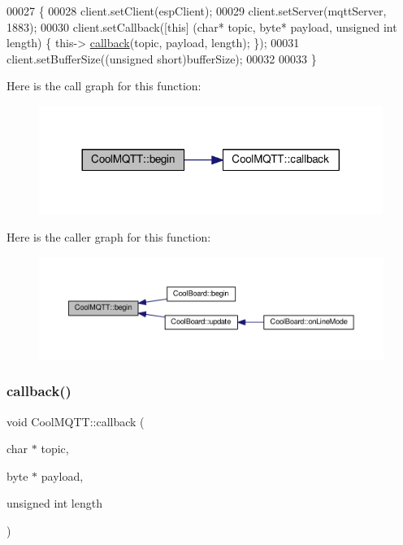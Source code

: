 \begin{DoxyCode}
00027 \{ 
00028     client.setClient(espClient);
00029     client.setServer(mqttServer, 1883); 
00030     client.setCallback([\textcolor{keyword}{this}] (\textcolor{keywordtype}{char}* topic, byte* payload, \textcolor{keywordtype}{unsigned} \textcolor{keywordtype}{int} length) \{ this->
      \hyperlink{class_cool_m_q_t_t_a30d82ad665bfb603f46ecdbc290775df}{callback}(topic, payload, length); \});
00031     client.setBufferSize((\textcolor{keywordtype}{unsigned} \textcolor{keywordtype}{short})bufferSize);
00032 
00033 \}
\end{DoxyCode}
Here is the call graph for this function\+:\nopagebreak
\begin{figure}[H]
\begin{center}
\leavevmode
\includegraphics[width=317pt]{class_cool_m_q_t_t_ac9248808641ebf3054ed0620ea9d0100_cgraph}
\end{center}
\end{figure}
Here is the caller graph for this function\+:
\nopagebreak
\begin{figure}[H]
\begin{center}
\leavevmode
\includegraphics[width=350pt]{class_cool_m_q_t_t_ac9248808641ebf3054ed0620ea9d0100_icgraph}
\end{center}
\end{figure}
\mbox{\label{class_cool_m_q_t_t_a30d82ad665bfb603f46ecdbc290775df}} 
\subsubsection{\texorpdfstring{callback()}{callback()}}
{\footnotesize\ttfamily void Cool\+M\+Q\+T\+T\+::callback (\begin{DoxyParamCaption}\item[{char $\ast$}]{topic,  }\item[{byte $\ast$}]{payload,  }\item[{unsigned int}]{length }\end{DoxyParamCaption})}

